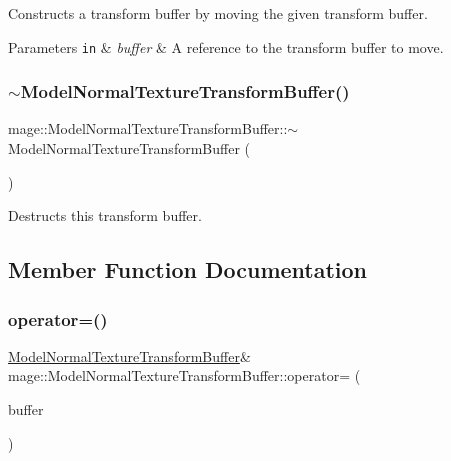Constructs a transform buffer by moving the given transform buffer.


\begin{DoxyParams}[1]{Parameters}
\mbox{\tt in}  & {\em buffer} & A reference to the transform buffer to move. \\
\hline
\end{DoxyParams}
\hypertarget{structmage_1_1_model_normal_texture_transform_buffer_a5b37f45ead4f5b40e2d9de8ef116a057}{}\label{structmage_1_1_model_normal_texture_transform_buffer_a5b37f45ead4f5b40e2d9de8ef116a057} 
\subsubsection{\texorpdfstring{$\sim$\+Model\+Normal\+Texture\+Transform\+Buffer()}{~ModelNormalTextureTransformBuffer()}}
{\footnotesize\ttfamily mage\+::\+Model\+Normal\+Texture\+Transform\+Buffer\+::$\sim$\+Model\+Normal\+Texture\+Transform\+Buffer (\begin{DoxyParamCaption}{ }\end{DoxyParamCaption})\hspace{0.3cm}{\ttfamily [default]}}

Destructs this transform buffer. 

\subsection{Member Function Documentation}
\hypertarget{structmage_1_1_model_normal_texture_transform_buffer_a5ce1f572ceecdb53b66d6f3f8f03e5f8}{}\label{structmage_1_1_model_normal_texture_transform_buffer_a5ce1f572ceecdb53b66d6f3f8f03e5f8} 
\subsubsection{\texorpdfstring{operator=()}{operator=()}\hspace{0.1cm}{\footnotesize\ttfamily [1/2]}}
{\footnotesize\ttfamily \hyperlink{structmage_1_1_model_normal_texture_transform_buffer}{Model\+Normal\+Texture\+Transform\+Buffer}\& mage\+::\+Model\+Normal\+Texture\+Transform\+Buffer\+::operator= (\begin{DoxyParamCaption}\item[{const \hyperlink{structmage_1_1_model_normal_texture_transform_buffer}{Model\+Normal\+Texture\+Transform\+Buffer} \&}]{buffer }\end{DoxyParamCaption})\hspace{0.3cm}{\ttfamily [default]}}

